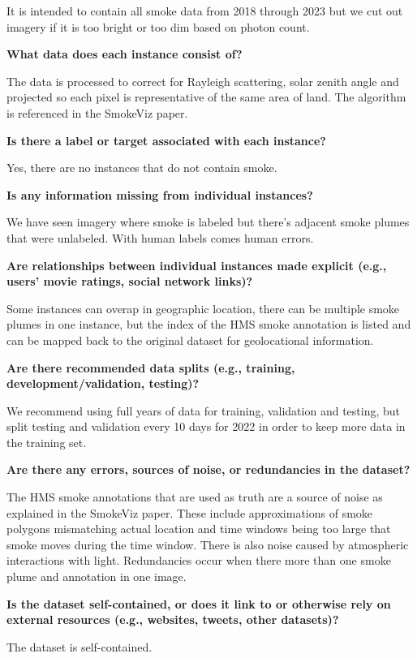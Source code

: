 \documentclass{article}
\begin{document}
It is intended to contain all smoke data from 2018 through 2023 but we cut out imagery if it is too bright or too dim based on photon count.

\textbf{What data does each instance consist of? }

The data is processed to correct for Rayleigh scattering, solar zenith angle and projected so each pixel is representative of the same area of land. The algorithm is referenced in the SmokeViz paper.

\textbf{Is there a label or target associated with each instance?}

Yes, there are no instances that do not contain smoke.

\textbf{Is any information missing from individual instances?}

We have seen imagery where smoke is labeled but there's adjacent smoke plumes that were unlabeled. With human labels comes human errors.

\textbf{Are relationships between individual instances made explicit (e.g., users’ movie ratings, social network links)?}

Some instances can overap in geographic location, there can be multiple smoke plumes in one instance, but the index of the HMS smoke annotation is listed and can be mapped back to the original dataset for geolocational information.

\textbf{Are there recommended data splits (e.g., training, development/validation, testing)?}

We recommend using full years of data for training, validation and testing, but split testing and validation every 10 days for 2022 in order to keep more data in the training set.

\textbf{Are there any errors, sources of noise, or redundancies in the dataset?}

The HMS smoke annotations that are used as truth are a source of noise as explained in the SmokeViz paper. These include approximations of smoke polygons mismatching actual location and time windows being too large that smoke moves during the time window. There is also noise caused by atmospheric interactions with light. Redundancies occur when there more than one smoke plume and annotation in one image.

\textbf{Is the dataset self-contained, or does it link to or otherwise rely on external resources (e.g., websites, tweets, other datasets)?}

The dataset is self-contained.
\end{document}
